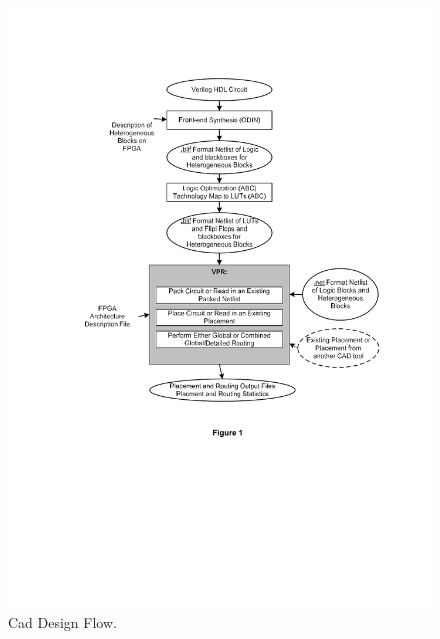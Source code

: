 \documentclass[12pt,final,oneside]{dwThesis} %
\begin{document}
   \begin{figure}

      \begin{center}
         \includegraphics*[viewport=40 280 550 750]{images/VPRCAD.pdf}
         \caption{Cad Design Flow.\cite{VPRManual}} \label{CADFlow}

      \end{center}

   \end{figure}
\end{document}
